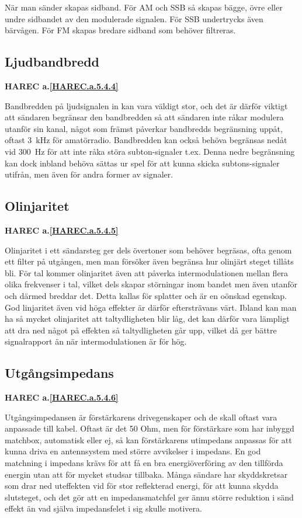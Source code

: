 När man sänder skapas sidband. För AM och SSB så skapas bägge, övre eller undre
sidbandet av den modulerade signalen. För SSB undertrycks även bärvågen.
För FM skapas bredare sidband som behöver filtreras.

\subsection{Ljudbandbredd}
\textbf{HAREC
  a.\ref{HAREC.a.5.4.4}\label{myHAREC.a.5.4.4}
}

Bandbredden på ljudsignalen in kan vara väldigt stor, och det är därför viktigt
att sändaren begränsar den bandbredden så att sändaren inte råkar modulera
utanför sin kanal, något som främst påverkar bandbredds begränsning uppåt,
oftast 3~kHz för amatörradio. Bandbredden kan också behöva begränsas nedåt vid
300~Hz för att inte råka störa subton-signaler t.ex. Denna nedre begränsning
kan dock inbland behöva sättas ur spel för att kunna skicka subtons-signaler
utifrån, men även för andra former av signaler.

\subsection{Olinjaritet}
\textbf{HAREC
  a.\ref{HAREC.a.5.4.5}\label{myHAREC.a.5.4.5}
}

Olinjaritet i ett sändarsteg ger dels övertoner som behöver begräsas, ofta
genom ett filter på utgången, men man försöker även begränsa hur olinjärt
steget tillåts bli. För tal kommer olinjaritet även att påverka
intermodulationen mellan flera olika frekvenser i tal, vilket dels skapar
störningar inom bandet men även utanför och därmed breddar det. Detta kallas
för splatter och är en oönskad egenskap. God linjaritet även vid höga effekter
är därför eftersträvans värt. Ibland kan man ha så mycket olinjaritet att
taltydligheten blir låg, det kan därför vara lämpligt att dra ned något på
effekten så taltydligheten går upp, vilket då ger bättre signalrapport än
när intermodulationen är för hög.

\subsection{Utgångsimpedans}
\textbf{HAREC
  a.\ref{HAREC.a.5.4.6}\label{myHAREC.a.5.4.6}
}

Utgångsimpedansen är förstärkarens drivegenskaper och de skall oftast vara
anpassade till kabel. Oftast är det 50 Ohm, men för förstärkare som har
inbyggd matchbox, automatisk eller ej, så kan förstärkarens utimpedans anpassas
för att kunna driva en antennsystem med större avvikelser i impedans.
En god matchning i impedans krävs för att få en bra energiöverföring av den
tillförda energin utan att för mycket studsar tillbaka. Många sändare har
skyddskretsar som drar ned uteffekten vid för stor reflekterad energi, för att
kunna skydda slutsteget, och det gör att en impedansmatchfel ger ännu större
reduktion i sänd effekt än vad själva impedansfelet i sig skulle motivera.

